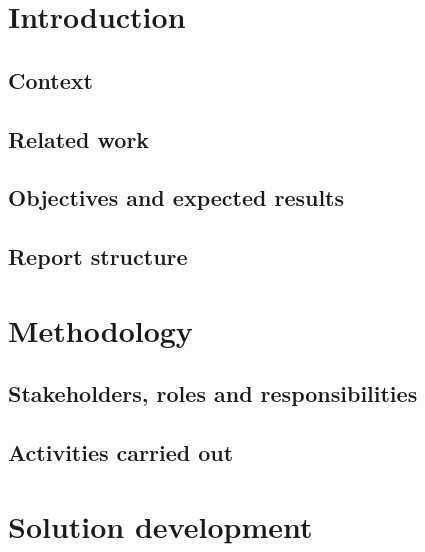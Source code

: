 \documentclass[10pt]{article}
\begin{document}
\thispagestyle{empty}
\tableofcontents

\clearpage

\section{Introduction}

\subsection{Context}



\subsection{Related work}



\subsection{Objectives and expected results}



\subsection{Report structure}



\section{Methodology}



\subsection{Stakeholders, roles and responsibilities}



\subsection{Activities carried out}



\section{Solution development}
\end{document}
